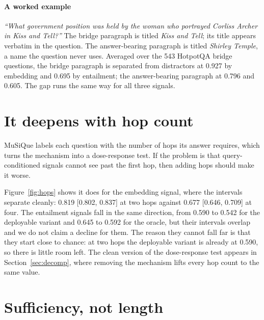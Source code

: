 \documentclass[conference]{IEEEtran}
\begin{document}
\paragraph{A worked example}
\emph{``What government position was held by the woman who portrayed Corliss
Archer in Kiss and Tell?''} The bridge paragraph is titled \emph{Kiss and Tell};
its title appears verbatim in the question. The answer-bearing paragraph is
titled \emph{Shirley Temple}, a name the question never uses. Averaged over the
543 HotpotQA bridge questions, the bridge paragraph is separated from
distractors at 0.927 by embedding and 0.695 by entailment; the answer-bearing
paragraph at 0.796 and 0.605. The gap runs the same way for all three signals.

\section{It deepens with hop count}
\label{sec:hops}



MuSiQue labels each question with the number of hops its answer requires, which
turns the mechanism into a dose-response test. If the problem is that
query-conditioned signals cannot see past the first hop, then adding hops should
make it worse.

Figure~\ref{fig:hops} shows it does for the embedding signal, where the
intervals separate cleanly: 0.819 [0.802, 0.837] at two hops against 0.677
[0.646, 0.709] at four. The entailment signals fall in the same direction, from
0.590 to 0.542 for the deployable variant and 0.645 to 0.592 for the oracle, but
their intervals overlap and we do not claim a decline for them. The reason they
cannot fall far is that they start close to chance: at two hops the deployable
variant is already at 0.590, so there is little room left. The clean version of
the dose-response test appears in Section~\ref{sec:decomp}, where removing the
mechanism lifts every hop count to the same value.

\section{Sufficiency, not length}
\label{sec:sufficiency}
\end{document}
